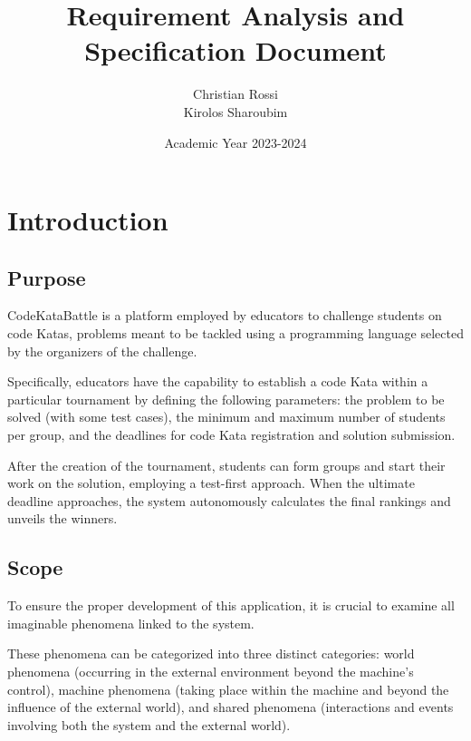 \documentclass[12pt, a4paper]{report}
\title{Requirement Analysis and Specification Document}
\author{Christian Rossi \\ Kirolos Sharoubim}
\date{Academic Year 2023-2024}
\begin{document}
\maketitle

\newpage

\tableofcontents

\newpage

\chapter{Introduction}
    \section{Purpose}
    CodeKataBattle is a platform employed by educators to challenge students on code Katas, problems meant to be tackled using a programming language selected by 
    the organizers of the challenge.
    
    Specifically, educators have the capability to establish a code Kata within a particular tournament by defining the following parameters: the problem to be solved 
    (with some test cases), the minimum and maximum number of students per group, and the deadlines for code Kata registration and solution submission.
    
    After the creation of the tournament, students can form groups and start their work on the solution, employing a test-first approach. When the ultimate deadline 
    approaches, the system autonomously calculates the final rankings and unveils the winners.

    \section{Scope}
    To ensure the proper development of this application, it is crucial to examine all imaginable phenomena linked to the system.
    
    These phenomena can be categorized into three distinct categories: world phenomena (occurring in the external environment beyond the machine's control), machine 
    phenomena (taking place within the machine and beyond the influence of the external world), and shared phenomena (interactions and events involving both the system
    and the external world).
\end{document}

